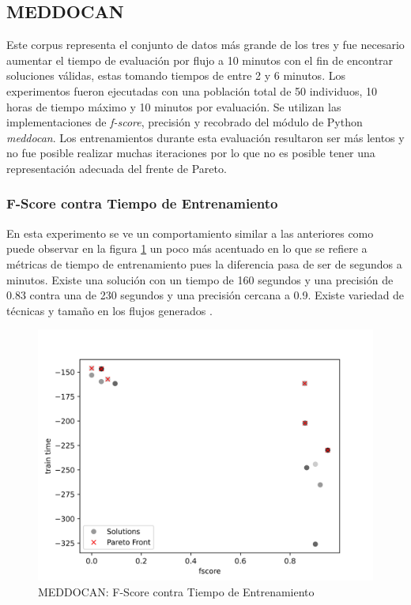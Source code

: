 \subsection{MEDDOCAN}
Este corpus representa el conjunto de datos m\'as grande de los tres y  fue necesario aumentar el tiempo de evaluaci\'on por flujo a 10 minutos con el fin de encontrar soluciones v\'alidas, estas tomando tiempos de entre 2 y 6 minutos. Los experimentos fueron ejecutadas con una poblaci\'on total de 50 individuos, 10 horas de tiempo m\'aximo y 10 minutos por evaluaci\'on. 
Se utilizan las implementaciones de \textit{f-score}, precisi\'on y recobrado del m\'odulo de Python \textit{meddocan}.
Los entrenamientos durante esta evaluaci\'on resultaron ser m\'as lentos y no fue posible realizar muchas iteraciones por lo que no es posible tener una representaci\'on adecuada del frente de Pareto.


\subsubsection{F-Score contra Tiempo de Entrenamiento}
En esta experimento se ve un comportamiento similar a las anteriores como puede observar en la figura  \ref{impl:fig:MEDDOCAN:fscore_vs_train_time} un poco m\'as acentuado en lo que se refiere a m\'etricas de tiempo de entrenamiento pues la diferencia pasa de ser de segundos a minutos. Existe una soluci\'on con un tiempo de 160 segundos y una precisi\'on de 0.83 contra una de 230 segundos y una precisi\'on cercana a 0.9. Existe variedad de t\'ecnicas y tama\~no en los flujos generados .


\begin{figure}[ht]
    \centering
    \includegraphics[scale=0.65]{Pictures/meddocan_fscore_vs_train.jpg}
    \caption{MEDDOCAN: F-Score contra Tiempo de Entrenamiento}
    \label{impl:fig:MEDDOCAN:fscore_vs_train_time}
\end{figure}


